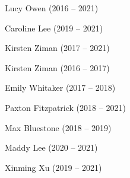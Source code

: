 \documentclass{tufte-book} %
\begin{document}
\begin{fullwidth}
\begin{multicols}{2}\raggedcolumns
  \begin{list}{\quad}{}
  \item Lucy Owen (2016 -- 2021)
  \item Caroline Lee (2019 -- 2021)
  \item Kirsten Ziman (2017 -- 2021)
  \end{list}
  \end{multicols}

\begin{multicols}{2}\raggedcolumns
\begin{list}{\quad}{}
\item Kirsten Ziman (2016 -- 2017)
\item Emily Whitaker (2017 -- 2018)
\item Paxton Fitzpatrick (2018 -- 2021)

\end{list}
\end{multicols}


\begin{multicols}{2}\raggedcolumns
\begin{list}{\quad}{}
\item Max Bluestone (2018 -- 2019)
\item Maddy Lee (2020 -- 2021)
\item Xinming Xu (2019 -- 2021)
\end{list}
\end{multicols}



\end{fullwidth}
\end{document}
